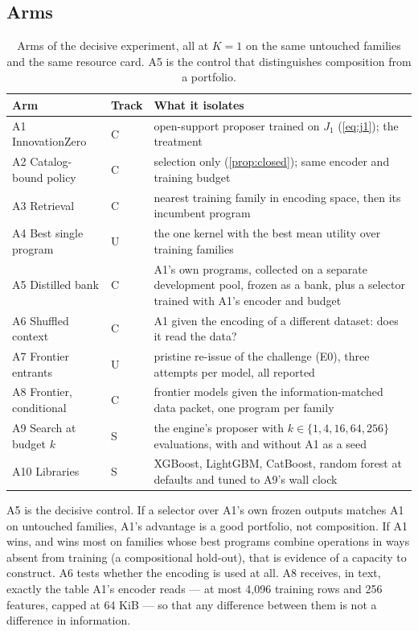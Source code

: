 \subsection{Arms}

\begin{table}[t]
\caption{Arms of the decisive experiment, all at $K=1$ on the same untouched families and the same
resource card. A5 is the control that distinguishes composition from a portfolio.}
\label{tab:arms}
\centering\sffamily\footnotesize\lining
\begin{tabularx}{\linewidth}{@{}llL@{}}
\toprule
Arm & Track & What it isolates \\
\midrule
A1 InnovationZero & C & open-support proposer trained on $J_1$ (\cref{eq:j1}); the treatment \\
A2 Catalog-bound policy & C & selection only (\cref{prop:closed}); same encoder and training budget \\
A3 Retrieval & C & nearest training family in encoding space, then its incumbent program \\
A4 Best single program & U & the one kernel with the best mean utility over training families \\
A5 Distilled bank & C & A1's own programs, collected on a separate development pool, frozen as a bank, plus a selector trained with A1's encoder and budget \\
A6 Shuffled context & C & A1 given the encoding of a different dataset: does it read the data? \\
A7 Frontier entrants & U & pristine re-issue of the challenge (E0), three attempts per model, all reported \\
A8 Frontier, conditional & C & frontier models given the information-matched data packet, one program per family \\
A9 Search at budget $k$ & S & the engine's proposer with $k\in\{1,4,16,64,256\}$ evaluations, with and without A1 as a seed \\
A10 Libraries & S & XGBoost, LightGBM, CatBoost, random forest at defaults and tuned to A9's wall clock \\
\bottomrule
\end{tabularx}
\end{table}

A5 is the decisive control. If a selector over A1's own frozen outputs matches A1 on untouched
families, A1's advantage is a good portfolio, not composition. If A1 wins, and wins most on families
whose best programs combine operations in ways absent from training (a compositional hold-out), that
is evidence of a capacity to construct. A6 tests whether the encoding is used at all. A8 receives,
in text, exactly the table A1's encoder reads --- at most 4,096 training rows and 256 features,
capped at 64 KiB --- so that any difference between them is not a difference in information.

